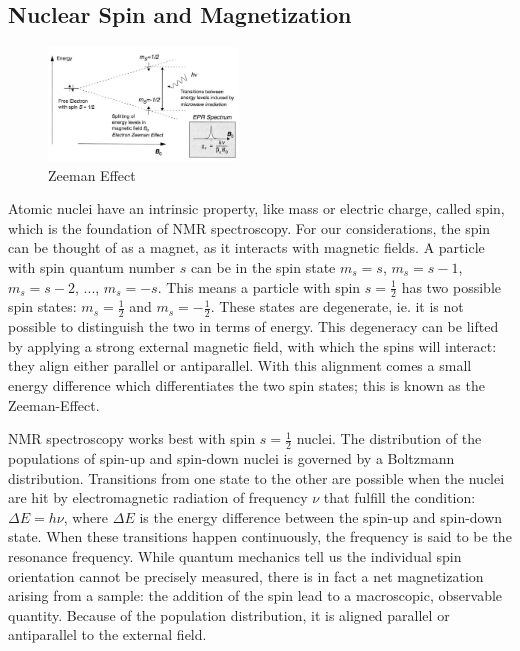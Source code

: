\documentclass[12pt]{article}
\begin{document}
\subsection{Nuclear Spin and Magnetization}
\begin{figure}
    \centering
    \includegraphics[width=0.45\textwidth]{ZeemanEffect.png}
    \caption{Zeeman Effect}
\end{figure}
Atomic nuclei have an intrinsic property, like mass or electric charge, called spin, which is the foundation of NMR spectroscopy. For our considerations, the spin can be thought of as a magnet, as it interacts with magnetic fields. A particle with spin quantum number $s$ can be in the spin state $m_s = s$, $m_s = s-1$, $m_s = s-2$, ..., $m_s = -s$. This means a particle with spin $s=\frac{1}{2}$ has two possible spin states: $m_s = \frac{1}{2}$ and $m_s = -\frac{1}{2}$. These states are degenerate, ie. it is not possible to distinguish the two in terms of energy. This degeneracy can be lifted by applying a strong external magnetic field, with which the spins will interact: they align either parallel or antiparallel. With this alignment comes a small energy difference which differentiates the two spin states; this is known as the Zeeman-Effect. 

NMR spectroscopy works best with spin $s=\frac{1}{2}$ nuclei. The distribution of the populations of spin-up and spin-down nuclei is governed by a Boltzmann distribution. Transitions from one state to the other are possible when the nuclei are hit by electromagnetic radiation of frequency $\nu$ that fulfill the condition: $\Delta E = h \nu$, where $\Delta E$ is the energy difference between the spin-up and spin-down state. When these transitions happen continuously, the frequency is said to be the resonance frequency. While quantum mechanics tell us the individual spin orientation cannot be precisely measured, there is in fact a net magnetization arising from a sample: the addition of the spin lead to a macroscopic, observable quantity. Because of the population distribution, it is aligned parallel or antiparallel to the external field.
\end{document}

